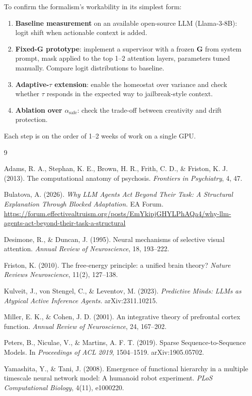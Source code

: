 \documentclass[12pt,a4paper]{article}
\begin{document}
To confirm the formalism's workability in its simplest form:

\begin{enumerate}
    \item \textbf{Baseline measurement} on an available open-source LLM (Llama-3-8B): logit shift when actionable context is added.
    \item \textbf{Fixed-G prototype}: implement a supervisor with a frozen $\mathbf{G}$ from system prompt, mask applied to the top 1--2 attention layers, parameters tuned manually. Compare logit distributions to baseline.
    \item \textbf{Adaptive-$\tau$ extension}: enable the homeostat over variance and check whether $\tau$ responds in the expected way to jailbreak-style context.
    \item \textbf{Ablation over $\alpha_{\text{safe}}$}: check the trade-off between creativity and drift protection.
\end{enumerate}

Each step is on the order of 1--2 weeks of work on a single GPU.

\begin{thebibliography}{9}

Adams, R. A., Stephan, K. E., Brown, H. R., Frith, C. D., \& Friston, K. J. (2013).
The computational anatomy of psychosis. \textit{Frontiers in Psychiatry}, 4, 47.

Bulatova, A. (2026).
\textit{Why LLM Agents Act Beyond Their Task: A Structural Explanation Through Blocked Adaptation.}
EA Forum. \url{https://forum.effectivealtruism.org/posts/EmYkipjGHYLPhAQa4/why-llm-agents-act-beyond-their-task-a-structural}

Desimone, R., \& Duncan, J. (1995).
Neural mechanisms of selective visual attention.
\textit{Annual Review of Neuroscience}, 18, 193--222.

Friston, K. (2010).
The free-energy principle: a unified brain theory?
\textit{Nature Reviews Neuroscience}, 11(2), 127--138.

Kulveit, J., von Stengel, C., \& Leventov, M. (2023).
\textit{Predictive Minds: LLMs as Atypical Active Inference Agents.}
arXiv:2311.10215.

Miller, E. K., \& Cohen, J. D. (2001).
An integrative theory of prefrontal cortex function.
\textit{Annual Review of Neuroscience}, 24, 167--202.

Peters, B., Niculae, V., \& Martins, A. F. T. (2019).
Sparse Sequence-to-Sequence Models.
In \textit{Proceedings of ACL 2019}, 1504--1519. arXiv:1905.05702.

Yamashita, Y., \& Tani, J. (2008).
Emergence of functional hierarchy in a multiple timescale neural network model: A humanoid robot experiment.
\textit{PLoS Computational Biology}, 4(11), e1000220.

\end{thebibliography}
\end{document}
